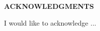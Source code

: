 \vspace*{1in}

\centerline{\large\bf ACKNOWLEDGMENTS}%
\vspace*{1in}

I would like to acknowledge ...%
\blindtext
%
